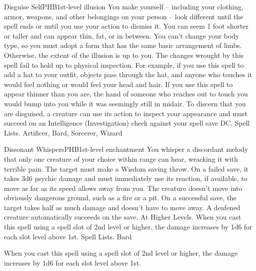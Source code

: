 \begin{spell}{Disguise Self}{PHB}{1st-level illusion}
{
}
You make yourself – including your clothing, armor, weapons, and other belongings on your person – look different until the spell ends or until you use your action to dismiss it. You can seem 1 foot shorter or taller and can appear thin, fat, or in between. You can’t change your body type, so you must adopt a form that has the same basic arrangement of limbs. Otherwise, the extent of the illusion is up to you.
The changes wrought by this spell fail to hold up to physical inspection. For example, if you use this spell to add a hat to your outfit, objects pass through the hat, and anyone who touches it would feel nothing or would feel your head and hair. If you use this spell to appear thinner than you are, the hand of someone who reaches out to touch you would bump into you while it was seemingly still in midair. To discern that you are disguised, a creature can use its action to inspect your appearance and must succeed on an Intelligence (Investigation) check against your spell save DC.
Spell Lists. Artificer, Bard, Sorcerer, Wizard
\end{spell}

\begin{spell}{Dissonant Whispers}{PHB}{1st-level enchantment}
{
}
You whisper a discordant melody that only one creature of your choice within range can hear, wracking it with terrible pain. The target must make a Wisdom saving throw. On a failed save, it takes 3d6 psychic damage and must immediately use its reaction, if available, to move as far as its speed allows away from you. The creature doesn’t move into obviously dangerous ground, such as a fire or a pit. On a successful save, the target takes half as much damage and doesn’t have to move away. A deafened creature automatically succeeds on the save.
At Higher Levels. When you cast this spell using a spell slot of 2nd level or higher, the damage increases by 1d6 for each slot level above 1st.
Spell Lists. Bard

 When you cast this spell using a spell slot of 2nd level or higher, the damage increases by 1d6 for each slot level above 1st.
\end{spell}

